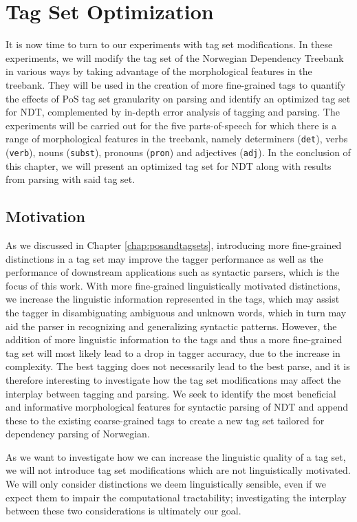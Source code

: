 \documentclass[a4paper,12pt,english]{book}
\begin{document}
\chapter{Tag Set Optimization}
\label{chap:experiments}
It is now time to turn to our experiments with tag set modifications. In these
experiments, we will modify the tag set of the Norwegian Dependency Treebank in
various ways by taking advantage of the morphological features in the treebank.
They will be used in the creation of more fine-grained tags to quantify the
effects of PoS tag set granularity on parsing and identify an optimized tag set
for NDT, complemented by in-depth error analysis of tagging and parsing. The
experiments will be carried out for the five parts-of-speech for which there is
a range of morphological features in the treebank, namely determiners
(\texttt{det}), verbs (\texttt{verb}), nouns (\texttt{subst}), pronouns
(\texttt{pron}) and adjectives (\texttt{adj}). In the conclusion of this
chapter, we will present an optimized tag set for NDT along with results from
parsing with said tag set.

\section{Motivation}
As we discussed in Chapter \ref{chap:posandtagsets}, introducing more
fine-grained distinctions in a tag set may improve the tagger performance as
well as the performance of downstream applications such as syntactic parsers,
which is the focus of this work. With more fine-grained linguistically
motivated distinctions, we increase the linguistic information represented in
the tags, which may assist the tagger in disambiguating ambiguous and unknown
words, which in turn may aid the parser in recognizing and generalizing
syntactic patterns. However, the addition of more linguistic information to the
tags and thus a more fine-grained tag set will most likely lead to a drop in
tagger accuracy, due to the increase in complexity. The best tagging does not
necessarily lead to the best parse, and it is therefore interesting to
investigate how the tag set modifications may affect the interplay between
tagging and parsing. We seek to identify the most beneficial and informative
morphological features for syntactic parsing of NDT and append these to the
existing coarse-grained tags to create a new tag set tailored for dependency
parsing of Norwegian.

As we want to investigate how we can increase the linguistic quality of a tag
set, we will not introduce tag set modifications which are not linguistically
motivated. We will only consider distinctions we deem linguistically sensible,
even if we expect them to impair the computational tractability; investigating
the interplay between these two considerations is ultimately our goal.
\end{document}
